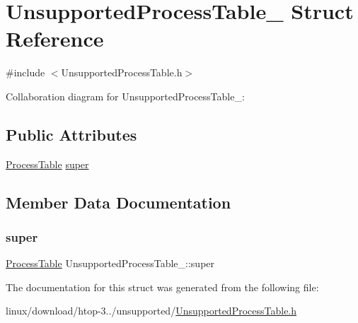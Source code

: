 \hypertarget{structUnsupportedProcessTable__}{}\section{Unsupported\+Process\+Table\+\_\+ Struct Reference}
\label{structUnsupportedProcessTable__}


{\ttfamily \#include $<$Unsupported\+Process\+Table.\+h$>$}



Collaboration diagram for Unsupported\+Process\+Table\+\_\+\+:
\subsection*{Public Attributes}
\begin{DoxyCompactItemize}
\item 
\hyperlink{ProcessTable_8h_a54ec62da6f9d80d4d06e3845a2597a80}{Process\+Table} \hyperlink{structUnsupportedProcessTable___a93c16e4c7dcc6747af567dbee2910732}{super}
\end{DoxyCompactItemize}


\subsection{Member Data Documentation}
\mbox{\label{structUnsupportedProcessTable___a93c16e4c7dcc6747af567dbee2910732}} 
\subsubsection{\texorpdfstring{super}{super}}
{\footnotesize\ttfamily \hyperlink{ProcessTable_8h_a54ec62da6f9d80d4d06e3845a2597a80}{Process\+Table} Unsupported\+Process\+Table\+\_\+\+::super}



The documentation for this struct was generated from the following file\+:\begin{DoxyCompactItemize}
\item 
linux/download/htop-\/3../unsupported/\hyperlink{UnsupportedProcessTable_8h}{Unsupported\+Process\+Table.\+h}\end{DoxyCompactItemize}
